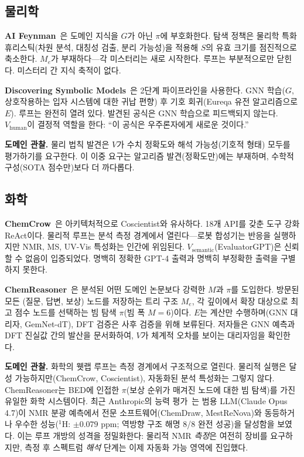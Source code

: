 \documentclass[11pt]{article}
\begin{document}
\subsection{물리학}

\textbf{AI Feynman}~\citep{udrescu2020afeynman}은 도메인 지식을 $G$가 아닌 $\pi$에 부호화한다. 탐색 정책은 물리학 특화 휴리스틱(차원 분석, 대칭성 검출, 분리 가능성)을 적용해 $S$의 유효 크기를 점진적으로 축소한다. $M_e$가 부재하다---각 미스터리는 새로 시작한다. 루프는 부분적으로만 닫힌다. 미스터리 간 지식 축적이 없다.

\textbf{Discovering Symbolic Models}~\citep{cranmer2020symbolic}은 2단계 파이프라인을 사용한다. GNN 학습($G$, 상호작용하는 입자 시스템에 대한 귀납 편향) 후 기호 회귀(Eureqa 유전 알고리즘으로 $E$). 루프는 완전히 열려 있다. 발견된 공식은 GNN 학습으로 피드백되지 않는다. $V_\text{human}$이 결정적 역할을 한다: ``이 공식은 우주론자에게 새로운 것이다.''

\textbf{도메인 관찰.} 물리 법칙 발견은 $V$가 수치 정확도와 해석 가능성(기호적 형태) 모두를 평가하기를 요구한다. 이 이중 요구는 알고리즘 발견(정확도만)에는 부재하며, 수학적 구성(SOTA 점수만)보다 더 까다롭다.

\subsection{화학}

\textbf{ChemCrow}~\citep{bran2023chemcrow}은 아키텍처적으로 Coscientist와 유사하다. 18개 API를 갖춘 도구 강화 ReAct이다. 물리적 루프는 분석 측정 경계에서 열린다---로봇 합성기는 반응을 실행하지만 NMR, MS, UV-Vis 특성화는 인간에 위임된다. $V_\text{semantic}$(EvaluatorGPT)은 신뢰할 수 없음이 입증되었다. 명백히 정확한 GPT-4 출력과 명백히 부정확한 출력을 구별하지 못한다.

\textbf{ChemReasoner}~\citep{sprueill2024chemreasoner}은 분석된 어떤 도메인 논문보다 강력한 $M$과 $\pi$를 도입한다. 방문된 모든 (질문, 답변, 보상) 노드를 저장하는 트리 구조 $M_e$, 각 깊이에서 확장 대상으로 최고 점수 노드를 선택하는 빔 탐색 $\pi$(빔 폭 $M=6$)이다. $E$는 계산만 수행하며(GNN 대리자, GemNet-dT), DFT 검증은 사후 검증을 위해 보류된다. 저자들은 GNN 예측과 DFT 진실값 간의 발산을 문서화하여, $V$가 체계적 오차를 보이는 대리자임을 확인한다.

\textbf{도메인 관찰.} 화학의 웻랩 루프는 측정 경계에서 구조적으로 열린다. 물리적 실행은 달성 가능하지만(ChemCrow, Coscientist), 자동화된 분석 특성화는 그렇지 않다. ChemReasoner는 BED에 인접한 $\pi$(보상 순위가 매겨진 노드에 대한 빔 탐색)를 가진 유일한 화학 시스템이다. 최근 Anthropic의 능력 평가~\citep{kamber2026chemist}는 범용 LLM(Claude Opus 4.7)이 NMR 분광 예측에서 전문 소프트웨어(ChemDraw, MestReNova)와 동등하거나 우수한 성능($^1\text{H}$: $\pm0.079$ ppm; 역방향 구조 해명 8/8 완전 성공)을 달성함을 보였다. 이는 루프 개방의 성격을 정밀화한다: 물리적 NMR \emph{측정}은 여전히 장비를 요구하지만, 측정 후 스펙트럼 \emph{해석} 단계는 이제 자동화 가능 영역에 진입했다.
\end{document}
